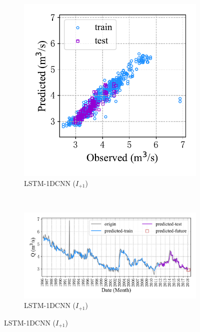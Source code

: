 \begin{figure}[!htbp]
\centering
  \begin{subfigure}[b]{0.305\textwidth}
    \includegraphics[width=\textwidth]{Img/chap4_spr/out2/spr_scatter_in_1_out_2_lstm_cnn.pdf}
    \vspace{-1.2cm}
    \caption{LSTM-1DCNN ($I_{+1}$)}
    \label{fig:spr_scatter_in_1_out_2_lstm_cnn}
  \end{subfigure}
  ~
  \begin{subfigure}[b]{0.615\textwidth}
    \includegraphics[width=\textwidth]{Img/chap4_spr/out2/spr_series_in_1_out_2_lstm_cnn.pdf}
    \vspace{-1.2cm}
    \caption{LSTM-1DCNN ($I_{+1}$)}
    \label{fig:spr_series_in_1_out_2_lstm_cnn}

\end{subfigure}
\end{figure}
